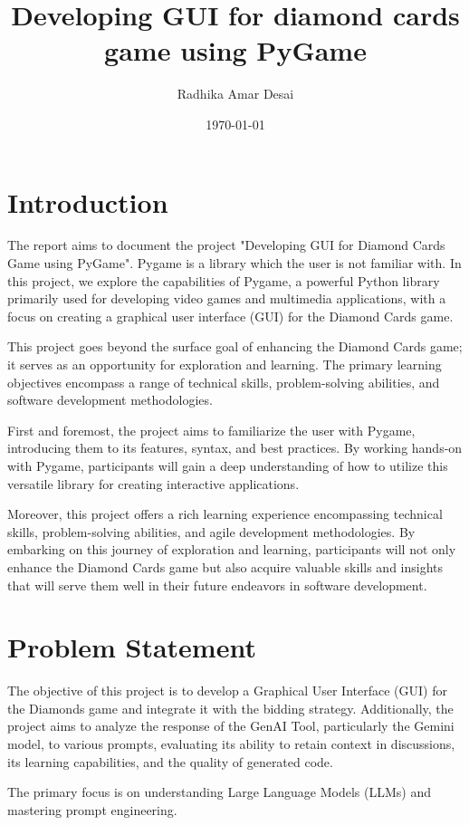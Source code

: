 \documentclass{article}
\title{Developing GUI for diamond cards game using PyGame}
\author{Radhika Amar Desai}
\date{\today}
\begin{document}
\maketitle

\section{Introduction}
The report aims to document the project "Developing GUI for Diamond Cards Game using PyGame". Pygame is a library which the user is not familiar with. In this project, we explore the capabilities of Pygame, a powerful Python library primarily used for developing video games and multimedia applications, with a focus on creating a graphical user interface (GUI) for the Diamond Cards game.

This project goes beyond the surface goal of enhancing the Diamond Cards game; it serves as an opportunity for exploration and learning. The primary learning objectives encompass a range of technical skills, problem-solving abilities, and software development methodologies.

First and foremost, the project aims to familiarize the user with Pygame, introducing them to its features, syntax, and best practices. By working hands-on with Pygame, participants will gain a deep understanding of how to utilize this versatile library for creating interactive applications.

Moreover, this project offers a rich learning experience encompassing technical skills, problem-solving abilities, and agile development methodologies. By embarking on this journey of exploration and learning, participants will not only enhance the Diamond Cards game but also acquire valuable skills and insights that will serve them well in their future endeavors in software development.

\section{Problem Statement}
The objective of this project is to develop a Graphical User Interface (GUI) for the Diamonds game and integrate it with the bidding strategy. Additionally, the project aims to analyze the response of the GenAI Tool, particularly the Gemini model, to various prompts, evaluating its ability to retain context in discussions, its learning capabilities, and the quality of generated code.

The primary focus is on understanding Large Language Models (LLMs) and mastering prompt engineering.
\end{document}
